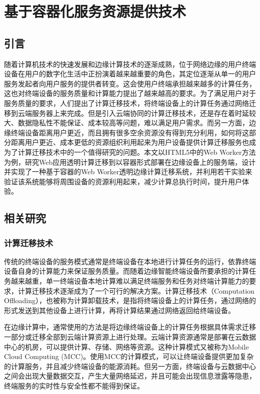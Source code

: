 
\chapter{基于容器化服务资源提供技术}\label{chap:computation_offloading}

\section{引言}

随着计算机技术的快速发展和边缘计算技术的逐渐成熟，位于网络边缘的用户终端设备在用户的数字化生活中正扮演着越来越重要的角色，其定位逐渐从单一的用户服务发起者向用户服务的提供者转变。这会使用户终端承担越来越多的计算任务，这也对终端设备的服务质量和计算能力提出了越来越高的要求。为了满足用户对于服务质量的要求，人们提出了计算迁移技术，将终端设备上的计算任务通过网络迁移到云端服务器上来完成。但是引入云端协同的计算迁移技术，还是存在着时延较大、数据隐私性不能保证、成本较高等问题，难以满足用户需求。而另一方面，边缘终端设备距离用户更近，而且拥有很多空余资源没有得到充分利用，如何将这部分距离用户更近、成本更低的资源组织利用起来为用户设备提供计算迁移服务也成为了计算迁移技术中的一个值得研究的问题。本文以HTML5中的Web Worker方法为例，研究Web应用透明计算迁移到以容器形式部署在边缘设备上的服务端，设计并实现了一种基于容器的Web Worker透明边缘计算迁移系统，并利用若干实验来验证该系统能够将周围设备的资源利用起来，减少计算总执行时间，提升用户体验。

\section{相关研究} 

\subsection{计算迁移技术}

传统的终端设备的服务模式通常是终端设备在本地进行计算任务的运行，依靠终端设备自身的计算能力来保证服务质量。而随着边缘智能终端设备所要承担的计算任务越来越重，单一终端设备本地计算难以满足终端服务和任务对终端计算能力的要求，计算迁移技术逐渐成为了一个可行的解决方案。计算迁移技术（Computation Offloading），也被称为计算卸载技术，是指将终端设备上的计算任务，通过网络的形式发送到其他设备上进行计算，再将计算结果通过网络返回给终端设备。

在边缘计算中，通常使用的方法是将边缘终端设备上的计算任务根据具体需求迁移一部分或迁移全部到云端计算资源上进行处理。云端计算资源通常是部署在云数据中心的机房，可以提供计算、存储、网络等资源。这种计算模式又被称为Mobile Cloud Computing (MCC)。使用MCC的计算模式，可以让终端设备提供更加复杂的计算服务，并且减少终端设备的能源消耗。但另一方面，终端设备与云数据中心之间会出现大量数据交互，产生大量网络延迟，并且可能会出现信息泄露等隐患，终端服务的实时性与安全性都不能得到保证。

